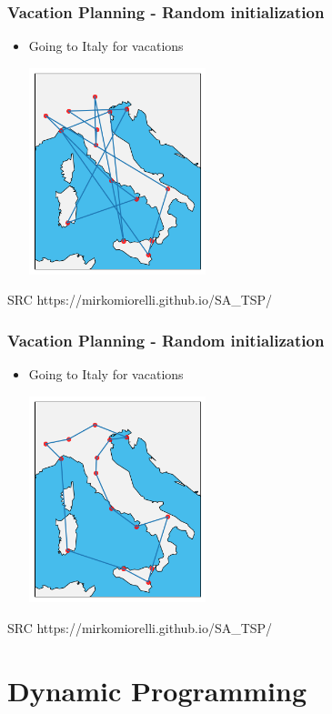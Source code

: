 \documentclass[10pt]{beamer}
\begin{document}
\begin{frame}
  \frametitle{Vacation Planning - Random initialization}
  \begin{itemize}
    \item Going to Italy for vacations
          \centerline{\includegraphics[height=6cm]{random_state}}
  \end{itemize}
  \centerline{SRC https://mirkomiorelli.github.io/SA\_TSP/}
\end{frame}


\begin{frame}
  \frametitle{Vacation Planning - Random initialization}
  \begin{itemize}
    \item Going to Italy for vacations
          \centerline{\includegraphics[height=6cm]{global_optimum}}
  \end{itemize}
  \centerline{SRC https://mirkomiorelli.github.io/SA\_TSP/}
\end{frame}


\section{Dynamic Programming}
\label{sec:dynamic-programming}
\end{document}
